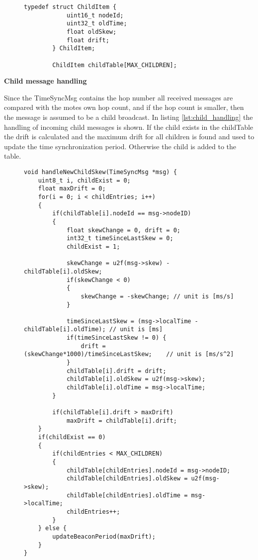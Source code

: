 \documentclass[Main]{subfiles}
\begin{document}
					\begin{figure}[H]
						\begin{lstlisting}[caption=Child table, style=Code-C, label=lst:child_table]
		typedef struct ChildItem {
			uint16_t nodeId;
			uint32_t oldTime;
			float oldSkew;
			float drift;
		} ChildItem;

		ChildItem childTable[MAX_CHILDREN];
			    		\end{lstlisting}
			    	\end{figure}
			    
			    \newpage
			    \textbf{Child message handling}	

			    	Since the TimeSyncMsg contains the hop number all received messages are compared with the motes own hop count, and if the hop count is smaller, then the message is assumed to be a child broadcast.
			    	In listing \ref{lst:child_handling} the handling of incoming child messages is shown.
			    	If the child exists in the childTable the drift is calculated and the maximum drift for all children is found and used to update the time synchronization period.
			    	Otherwise the child is added to the table.
			    	\begin{figure}[H]
						\begin{lstlisting}[caption=Handling incoming child msg, style=Code-C, label=lst:child_handling]
void handleNewChildSkew(TimeSyncMsg *msg) {
	uint8_t i, childExist = 0;
	float maxDrift = 0;
	for(i = 0; i < childEntries; i++)
	{
		if(childTable[i].nodeId == msg->nodeID)
		{
			float skewChange = 0, drift = 0;
			int32_t timeSinceLastSkew = 0;
			childExist = 1;
			
			skewChange = u2f(msg->skew) - childTable[i].oldSkew;				
			if(skewChange < 0)
			{
				skewChange = -skewChange; // unit is [ms/s]
			}
			
			timeSinceLastSkew = (msg->localTime - childTable[i].oldTime); // unit is [ms]
			if(timeSinceLastSkew != 0) {
				drift = (skewChange*1000)/timeSinceLastSkew;	// unit is [ms/s^2]
			}
			childTable[i].drift = drift;
			childTable[i].oldSkew = u2f(msg->skew);
			childTable[i].oldTime = msg->localTime;					
		}
		
		if(childTable[i].drift > maxDrift)
			maxDrift = childTable[i].drift;
	}
	if(childExist == 0)
	{
		if(childEntries < MAX_CHILDREN)
		{
			childTable[childEntries].nodeId = msg->nodeID;
			childTable[childEntries].oldSkew = u2f(msg->skew);
			childTable[childEntries].oldTime = msg->localTime;
			childEntries++;
		}
	} else {
		updateBeaconPeriod(maxDrift);
	}
}

						\end{lstlisting}
			    	\end{figure}
\end{document}
